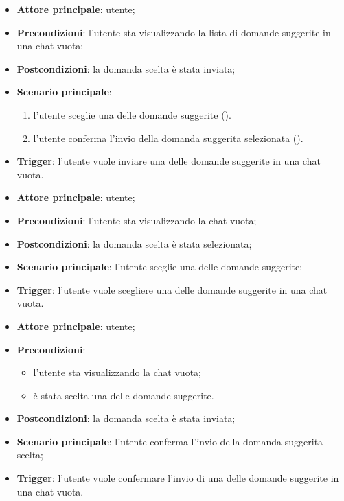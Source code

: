 \documentclass[10pt, a4paper]{article}
\begin{document}
    \begin{itemize}
        \item \textbf{Attore principale}: utente;
        \item \textbf{Precondizioni}: l’utente sta visualizzando la lista di domande suggerite in una chat vuota;
        \item \textbf{Postcondizioni}: la domanda scelta è stata inviata;
        \item \textbf{Scenario principale}:
        \begin{enumerate}
            \item l’utente sceglie una delle domande suggerite ().
            \item l’utente conferma l'invio della domanda suggerita selezionata ().
        \end{enumerate}
        \item \textbf{Trigger}: l’utente vuole inviare una delle domande suggerite in una chat vuota.
    \end{itemize}

    \begin{itemize}
        \item \textbf{Attore principale}: utente;
        \item \textbf{Precondizioni}: l’utente sta visualizzando la chat vuota;
        \item \textbf{Postcondizioni}: la domanda scelta è stata selezionata;
        \item \textbf{Scenario principale}: l’utente sceglie una delle domande suggerite;
        \item \textbf{Trigger}: l’utente vuole scegliere una delle domande suggerite in una chat vuota.
    \end{itemize}

    \begin{itemize}
        \item \textbf{Attore principale}: utente;
        \item \textbf{Precondizioni}:
            \begin{itemize}
                \item l’utente sta visualizzando la chat vuota;
                \item è stata scelta una delle domande suggerite.
            \end{itemize}
        \item \textbf{Postcondizioni}: la domanda scelta è stata inviata;
        \item \textbf{Scenario principale}: l’utente conferma l'invio della domanda suggerita scelta;
        \item \textbf{Trigger}: l’utente vuole confermare l'invio di una delle domande suggerite in una chat vuota.
    \end{itemize}
\end{document}
